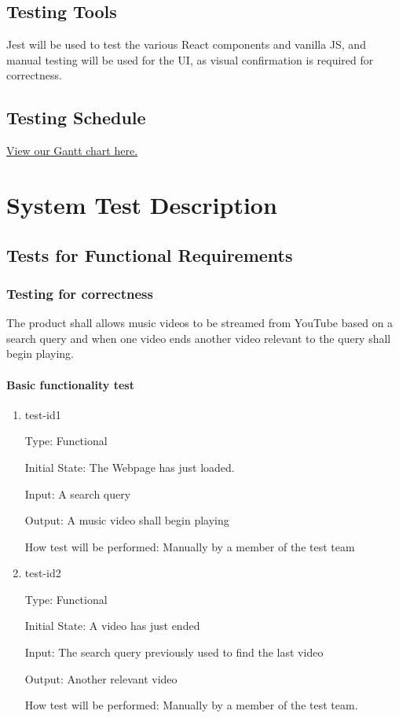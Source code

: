\documentclass[12pt, titlepage]{article}
\begin{document}
\subsection{Testing Tools}
Jest will be used to test the various React components and vanilla JS, and manual testing will be used for the UI, as visual confirmation is required for correctness.

\subsection{Testing Schedule}
		
\href{https://gitlab.cas.mcmaster.ca/delalik/Shuffle/blob/master/ProjectSchedule/Shuffle.gan}{View our Gantt chart here.}

\section{System Test Description}
	
\subsection{Tests for Functional Requirements}

\subsubsection{Testing for correctness}

The product shall allows music videos to be streamed from YouTube based on a search query and when one video ends another video relevant to the query shall begin playing.
		
\paragraph{Basic functionality test}

\begin{enumerate}

\item{test-id1\\}

Type: Functional
					
Initial State: The Webpage has just loaded.
					
Input: A search query
					
Output: A music video shall begin playing
					
How test will be performed: Manually by a member of the test team
					
\item{test-id2\\}

Type: Functional
					
Initial State: A video has just ended
					
Input: The search query previously used to find the last video
					
Output: Another relevant video
					
How test will be performed: Manually by a member of the test team.

\end{enumerate}
\end{document}
